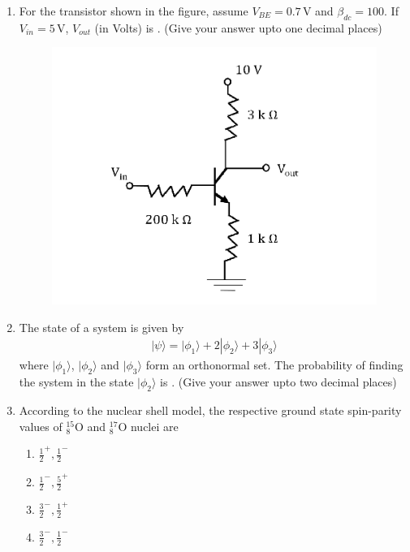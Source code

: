 \documentclass[journal,12pt,onecolumn]{IEEEtran}
\theoremstyle{remark}
\begin{document}
\begin{enumerate}
    \item For the transistor shown in the figure, assume $V_{BE} = 0.7\,\text{V}$ and $\beta_{dc} = 100$. If $V_{in} = 5\,\text{V}$, $V_{out}$ (in Volts) is \underline{\hspace{2cm}}. (Give your answer upto one decimal places)
    \begin{figure}[H]
    \centering
    \includegraphics[width = 0.8\columnwidth]{fig/Q52.png}
    \caption*{}
    \label{fig:Q52}
   \end{figure}
    \item The state of a system is given by
    \begin{align*}
        |\psi\rangle = |\phi_1\rangle + 2|\phi_2\rangle + 3|\phi_3\rangle
    \end{align*}
    where $|\phi_1\rangle$, $|\phi_2\rangle$ and $|\phi_3\rangle$ form an orthonormal set. The probability of finding the system in the state $|\phi_2\rangle$ is \underline{\hspace{2cm}}. (Give your answer upto two decimal places)

    \item According to the nuclear shell model, the respective ground state spin-parity values of $^{15}_{8}\mathrm{O}$ and $^{17}_{8}\mathrm{O}$ nuclei are
    \begin{multicols}{2}
    \begin{enumerate}
        \item $\frac{1}{2}^+, \frac{1}{2}^-$
        \item $\frac{1}{2}^-,\frac{5}{2}^+$
        \item $\frac{3}{2}^-,\frac{1}{2}^+ $
        \item $\frac{3}{2}^- , \frac{1}{2}^-$
    \end{enumerate}
    \end{multicols}
  

\end{enumerate}
\end{document}
